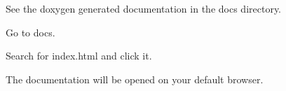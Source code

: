 \label{md__r_e_a_d_m_e_autotoc_md0}%
%

\begin{DoxyItemize}
\item See the doxygen generated documentation in the {\ttfamily docs} directory.
\begin{DoxyEnumerate}
\item Go to {\ttfamily docs}.
\item Search for {\ttfamily index.\+html} and click it.
\item The documentation will be opened on your default browser. 
\end{DoxyEnumerate}
\end{DoxyItemize}